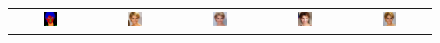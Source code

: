 \begin{figure}[]
\begin{tabular} {cc|cc|c}
\includegraphics[width=0.1932\textwidth]{Images/Rec/Faces/label/28434.png} & \includegraphics[width=0.1932\textwidth]{Images/Rec/Faces/gt/28434.jpg} &
\includegraphics[width=0.1932\textwidth]{Images/Rec/Faces/pix2pixhd/28434.jpg}&
\includegraphics[width=0.1932\textwidth]{Images/Rec/Faces/spade/28434.jpg} &  \includegraphics[width=0.1932\textwidth]{Images/Rec/Faces/ours/28434.png} \\


\end{tabular}
\end{figure}
